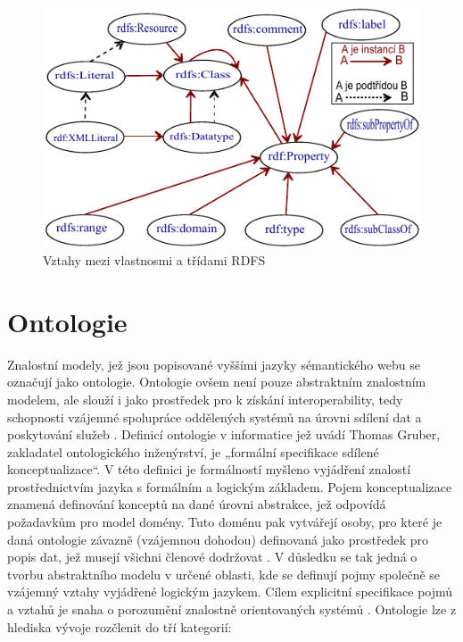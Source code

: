 \documentclass{projekt}
\begin{document}
\begin{figure}[htb]
\begin{center}
\includegraphics[scale=1.4]{rdfs.pdf}
\caption{Vztahy mezi vlastnosmi a třídami RDFS}
\end{center}
\end{figure}

\section{Ontologie}
\hspace{0.65cm}Znalostní modely, jež jsou popisované vyššími jazyky sémantického webu se označují jako ontologie. Ontologie ovšem není pouze abstraktním znalostním modelem, ale slouží i jako prostředek pro k získání interoperability, tedy schopnosti vzájemné spolupráce oddělených systémů na úrovni sdílení dat a poskytování služeb \cite{_2}. Definicí ontologie v informatice jež uvádí Thomas Gruber, zakladatel ontologického inženýrství, je „formální specifikace sdílené konceptualizace“\cite{_8}. V této definici je formálností myšleno vyjádření znalostí prostřednictvím jazyka s formálním a logickým základem. Pojem konceptualizace znamená definování konceptů na dané úrovni abstrakce, jež odpovídá požadavkům pro model domény. Tuto doménu pak vytvářejí osoby, pro které je daná ontologie závazně (vzájemnou dohodou) definovaná jako prostředek pro popis dat, jež musejí všichni členové dodržovat \cite{_2}. V důsledku se tak jedná o tvorbu abstraktního modelu v určené oblasti, kde se definují pojmy společně se vzájemný vztahy vyjádřené logickým jazykem. Cílem explicitní specifikace pojmů a vztahů je snaha o porozumění znalostně orientovaných systémů \cite{_9}.
Ontologie lze z hlediska vývoje rozčlenit do tří kategorií:
\end{document}
